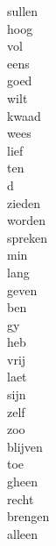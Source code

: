 \begin{minipage}[t]{0.25\textwidth}
	sullen\\
	hoog\\
	vol\\
	eens\\
	goed\\
	wilt\\
	kwaad\\
	wees\\
	lief\\
	ten\\
	d\\
	zieden\\
	worden\\
	spreken\\
	min\\
	lang\\
	geven\\
	ben\\
	gy\\
	heb\\
	vrij\\
	laet\\
	sijn\\
	zelf\\
	zoo\\
	blijven\\
	toe\\
	gheen\\
	recht\\
	brengen\\
	alleen\\
\end{minipage}
